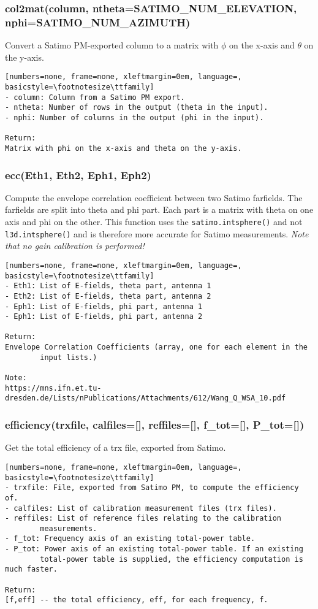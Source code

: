 \subsubsection{col2mat(column, ntheta=SATIMO\_NUM\_ELEVATION, nphi=SATIMO\_NUM\_AZIMUTH)}
Convert a Satimo PM-exported column to a matrix with $\phi$ on the 
x-axis and $\theta$ on the y-axis.

\begin{lstlisting}[numbers=none, frame=none, xleftmargin=0em, language=, basicstyle=\footnotesize\ttfamily]
- column: Column from a Satimo PM export.
- ntheta: Number of rows in the output (theta in the input).
- nphi: Number of columns in the output (phi in the input).

Return:
Matrix with phi on the x-axis and theta on the y-axis.
\end{lstlisting}

\subsubsection{ecc(Eth1, Eth2, Eph1, Eph2)}
Compute the envelope correlation coefficient between two Satimo farfields.
The farfields are split into theta and phi part. Each part is a matrix with
theta on one axis and phi on the other. This function uses the
\texttt{satimo.intsphere()} and not \texttt{l3d.intsphere()} and is therefore
more accurate for Satimo measurements. \emph{Note that no gain calibration is
performed!}

\begin{lstlisting}[numbers=none, frame=none, xleftmargin=0em, language=, basicstyle=\footnotesize\ttfamily]
- Eth1: List of E-fields, theta part, antenna 1
- Eth2: List of E-fields, theta part, antenna 2
- Eph1: List of E-fields, phi part, antenna 1
- Eph1: List of E-fields, phi part, antenna 2

Return:
Envelope Correlation Coefficients (array, one for each element in the
        input lists.)

Note:
https://mns.ifn.et.tu-dresden.de/Lists/nPublications/Attachments/612/Wang_Q_WSA_10.pdf
\end{lstlisting}

\subsubsection{efficiency(trxfile, calfiles=[], reffiles=[], f\_tot=[], P\_tot=[])}
Get the total efficiency of a trx file, exported from Satimo.

\begin{lstlisting}[numbers=none, frame=none, xleftmargin=0em, language=, basicstyle=\footnotesize\ttfamily]
- trxfile: File, exported from Satimo PM, to compute the efficiency of.
- calfiles: List of calibration measurement files (trx files).
- reffiles: List of reference files relating to the calibration
        measurements.
- f_tot: Frequency axis of an existing total-power table.
- P_tot: Power axis of an existing total-power table. If an existing
        total-power table is supplied, the efficiency computation is much faster.

Return:
[f,eff] -- the total efficiency, eff, for each frequency, f.
\end{lstlisting}

